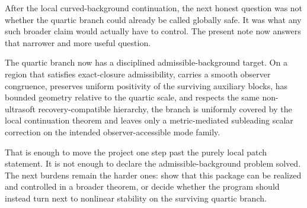 \documentclass[11pt]{article}
\begin{document}
After the local curved-background continuation, the next honest question was not whether the quartic branch could already be called globally safe. It was what any such broader claim would actually have to control. The present note now answers that narrower and more useful question.

The quartic branch now has a disciplined admissible-background target. On a region that satisfies exact-closure admissibility, carries a smooth observer congruence, preserves uniform positivity of the surviving auxiliary blocks, has bounded geometry relative to the quartic scale, and respects the same non-ultrasoft recovery-compatible hierarchy, the branch is uniformly covered by the local continuation theorem and leaves only a metric-mediated subleading scalar correction on the intended observer-accessible mode family.

That is enough to move the project one step past the purely local patch statement. It is not enough to declare the admissible-background problem solved. The next burdens remain the harder ones: show that this package can be realized and controlled in a broader theorem, or decide whether the program should instead turn next to nonlinear stability on the surviving quartic branch.
\end{document}
